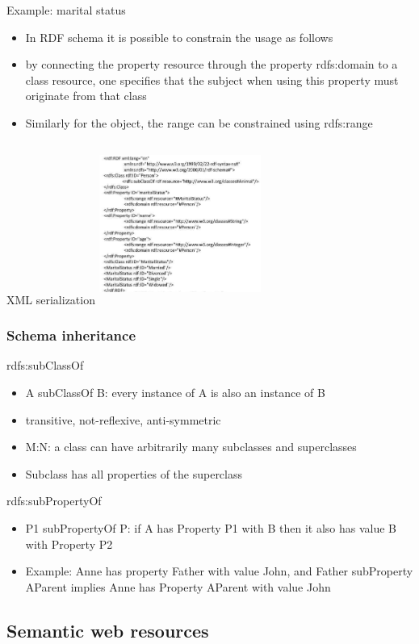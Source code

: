 Example: marital status
\begin{itemize}
\item In RDF schema it is possible to constrain the usage as follows
\item by connecting the property resource through the property
  rdfs:domain to a class resource, one specifies that the subject when
  using this property must originate from that class
\item Similarly for the object, the range can be constrained using
  rdfs:range
\end{itemize}

XML serialization
\includegraphics[width=200px, height=200px]{rdfsxml}

\subsubsection{Schema inheritance}
rdfs:subClassOf
\begin{itemize}
\item A subClassOf B: every instance of A is also an instance of B
\item transitive, not-reflexive, anti-symmetric
\item M:N: a class can have arbitrarily many subclasses and
  superclasses
\item Subclass has all properties of the superclass
\end{itemize}

rdfs:subPropertyOf
\begin{itemize}
\item P1 subPropertyOf P: if A has Property P1 with B then it also has
  value B with Property P2
\item Example: Anne has property Father with value John, and Father
  subProperty AParent implies Anne has Property AParent with value John
\end{itemize}

\subsection{Semantic web resources}

